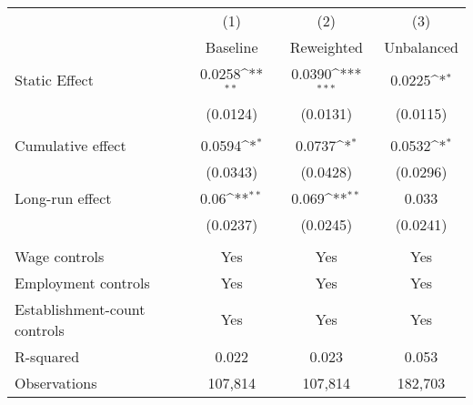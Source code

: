 {
\def\sym#1{\ifmmode^{#1}\else\(^{#1}\)\fi}
\begin{tabular}{l*{3}{c}}
\hline\hline
          &\multicolumn{1}{c}{(1)}&\multicolumn{1}{c}{(2)}&\multicolumn{1}{c}{(3)}\\
          &\multicolumn{1}{c}{Baseline}&\multicolumn{1}{c}{Reweighted}&\multicolumn{1}{c}{Unbalanced}\\
\hline
Static Effect&   0.0258\sym{**} &   0.0390\sym{***}&   0.0225\sym{*}  \\
          & (0.0124)         & (0.0131)         & (0.0115)         \\
\hline
\vspace{-2mm}&                  &                  &                  \\
Cumulative effect&0.0594\sym{*}         &0.0737\sym{*}         &0.0532\sym{*}         \\
          & (0.0343)         & (0.0428)         & (0.0296)         \\
Long-run effect&0.06\sym{**}         &0.069\sym{**}         &    0.033         \\
          & (0.0237)         & (0.0245)         & (0.0241)         \\
\hline    &                  &                  &                  \\
Wage controls&      Yes         &      Yes         &      Yes         \\
Employment controls&      Yes         &      Yes         &      Yes         \\
Establishment-count controls&      Yes         &      Yes         &      Yes         \\
R-squared &    0.022         &    0.023         &    0.053         \\
Observations&  107,814         &  107,814         &  182,703         \\
\hline\hline
\end{tabular}
}
